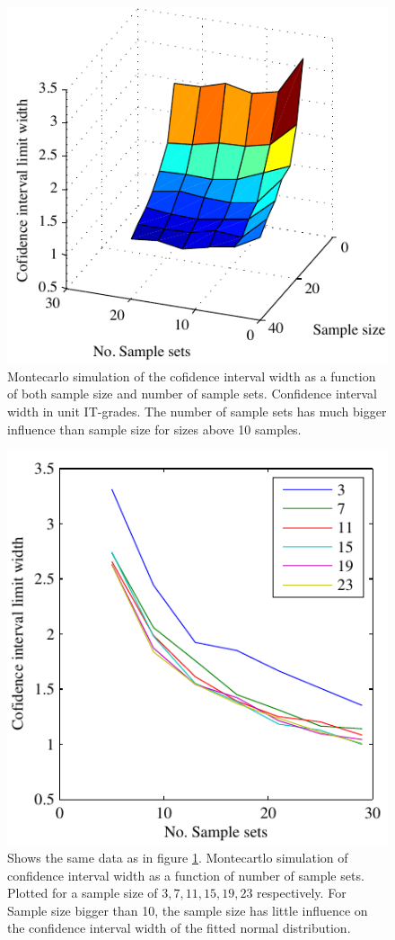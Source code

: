 \documentclass[aip,amsmath, reprint, author-year]{revtex4-1}
\begin{document}
\begin{figure}
\includegraphics{CLW90_surf.pdf}
\caption{\label{fig:cl_surf} Montecarlo simulation of the cofidence interval width as a function of both sample size and number of sample sets. Confidence interval width in unit IT-grades. The number of sample sets has much bigger influence than sample size for sizes above 10 samples.}
\end{figure}

\begin{figure}
\includegraphics{CLW90_lines.pdf}
\caption{\label{fig:cl_line}Shows the same data as in figure \ref{fig:cl_surf}. Montecartlo simulation of confidence interval width as a function of number of sample sets. Plotted for a sample size of ${3,7,11,15,19,23}$ respectively.
For Sample size bigger than 10, the sample size has little influence on the confidence interval width of the fitted normal distribution.}
\end{figure}
\end{document}
